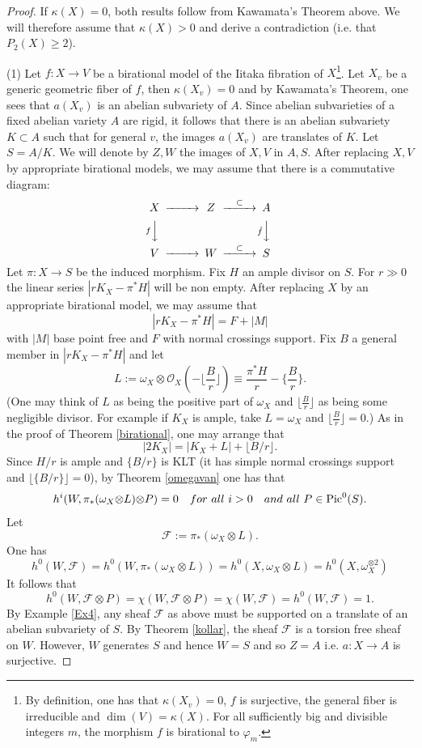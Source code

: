 \documentclass[10pt]{amsart}
\newcommand\Pic{{\text{\rm Pic}}}
\newcommand\alb{{ a}}
\newcommand\lra{\longrightarrow}
\newcommand\Alb{{ A}}
\newcommand\ot{{\otimes}}
\newcommand\OO{{\mathcal{O}}}
\newcommand\FF{{\mathcal{F}}}
\begin{document}
\begin{proof} 
If $\kappa (X)=0$, both results follow from Kawamata's Theorem above.
We will therefore assume that $\kappa (X)>0$ and derive a contradiction
(i.e. that $P_2(X)\geq 2$).

(1) Let $f:X\lra V$ be a birational model of the Iitaka fibration of 
$X$\footnote{ By definition, one has that $\kappa (X_v)=0$, $f$ is surjective,
the general fiber is irreducible and $\dim (V)=\kappa (X)$. 
For all sufficiently big and divisible integers $m$, 
the morphism $f$ is birational
to $\varphi _m$.}.
Let $X_v$ be a generic geometric fiber of $f$, then $\kappa (X_v)=0$
and by Kawamata's Theorem, one sees that $\alb (X_v)$ is an 
abelian subvariety of $\Alb$. Since abelian subvarieties of 
a fixed abelian variety
$A$ are rigid, it follows that there is an abelian subvariety $K\subset \Alb$
such that for general $v$, the images $\alb (X_v )$ are translates of $K$.
Let $S=A/K$. We will denote by $Z,W$ the images of $X,V$ in $A,S$.
After replacing $X,V$ by appropriate birational models,
we may assume that there is a commutative diagram:
$$
\begin{CD}
X @>>> Z @>{\subset}>>A \\
@V{f}VV  & &     @V{\hat{f}}VV \\
V @>>> W @>{\subset}>> S
\end{CD}
$$
Let $\pi :X \lra S$ be the induced morphism.
Fix $H$ an ample divisor on $S$. For $r\gg 0$ the linear series
$|rK_X-\pi ^* H|$ will be non empty. After replacing $X$
by an appropriate birational model, we may assume that
$$|rK_X-\pi ^* H|=F+|M|$$
with $|M|$ base point free and $F$ with normal crossings support.
Fix $B$ a general member in $|rK_X-\pi ^*H|$ and let
$$L:=\omega _X \ot \OO _X\left( -\lfloor \frac {B}{r}\rfloor \right)
\equiv \frac {\pi ^*H}{r}-\{ \frac {B}{r} \} .$$
(One may think of $L$ as being the positive part of $\omega _X$
and $ \lfloor \frac {B}{r}\rfloor$ as being some negligible divisor.
For example if $K_X$ is ample, take $L=\omega _X$ and 
$ \lfloor \frac {B}{r}\rfloor =0$.)
As in the proof of Theorem \ref{birational}, 
one may arrange that $$|2K_X|=|K_X +L|+\lfloor
B/r\rfloor .$$ Since $ {H}/{r}$ is ample and $\{ B/r\}$ is KLT
(it has simple normal crossings support and $\lfloor \{ B/r\}
\rfloor =0$), by Theorem \ref{omegavan}
one has that $$h^i(W, \pi _* (\omega _X \ot L)\ot P)=0\ \ \  for\  all\ i>0
\ \ \ and\ all\ P\in \Pic ^0(S).$$
Let $$\FF:=\pi _* (\omega _X \ot L).$$
One has
$$h^0(W,\FF )=h^0( W, \pi _* (\omega _X \ot L))=h^0(X, \omega _X \ot L)=
h^0(X,\omega _X ^{\ot 2})$$
It follows that 
$$h^0(W, \FF \ot P)=\chi (W, \FF \ot P)=\chi (W, \FF )=h^0(W,\FF )=1.$$
By Example \ref{Ex4}, any sheaf $\FF$ as 
above must be supported on a translate
of an abelian subvariety of $S$. By Theorem \ref{kollar}, 
the sheaf $\FF$ is a torsion free
sheaf on $W$. However, $W$ generates $S$ and hence $W=S$
and so $Z=\Alb$ i.e. $\alb :X\lra \Alb$ is surjective.


\end{proof}
\end{document}
